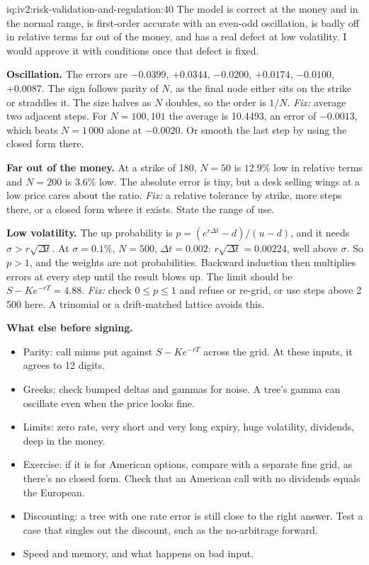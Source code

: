 \begin{solution}{iq:iv2:risk-validation-and-regulation:40}
The model is correct at the money and in the normal range, is first-order accurate with an even-odd oscillation, is badly off in relative terms far out of the money, and has a real defect at low volatility. I would approve it with conditions once that defect is fixed.

\textbf{Oscillation.} The errors are $-0.0399$, $+0.0344$, $-0.0200$, $+0.0174$, $-0.0100$, $+0.0087$. The sign follows parity of $N$, as the final node either sits on the strike or straddles it. The size halves as $N$ doubles, so the order is $1/N$. \emph{Fix:} average two adjacent steps. For $N = 100, 101$ the average is 10.4493, an error of $-0.0013$, which beats $N = 1\,000$ alone at $-0.0020$. Or smooth the last step by using the closed form there.

\textbf{Far out of the money.} At a strike of 180, $N = 50$ is $12.9\%$ low in relative terms and $N = 200$ is $3.6\%$ low. The absolute error is tiny, but a desk selling wings at a low price cares about the ratio. \emph{Fix:} a relative tolerance by strike, more steps there, or a closed form where it exists. State the range of use.

\textbf{Low volatility.} The up probability is $p = (e^{r\Delta t} - d)/(u - d)$, and it needs $\sigma > r\sqrt{\Delta t}$. At $\sigma = 0.1\%$, $N = 500$, $\Delta t = 0.002$: $r\sqrt{\Delta t} = 0.00224$, well above $\sigma$. So $p > 1$, and the weights are not probabilities. Backward induction then multiplies errors at every step until the result blows up. The limit should be $S - Ke^{-rT} = 4.88$. \emph{Fix:} check $0 \le p \le 1$ and refuse or re-grid, or use steps above 2\,500 here. A trinomial or a drift-matched lattice avoids this.

\textbf{What else before signing.}
\begin{itemize}
\item Parity: call minus put against $S - Ke^{-rT}$ across the grid. At these inputs, it agrees to 12 digits.
\item Greeks: check bumped deltas and gammas for noise. A tree's gamma can oscillate even when the price looks fine.
\item Limits: zero rate, very short and very long expiry, huge volatility, dividends, deep in the money.
\item Exercise: if it is for American options, compare with a separate fine grid, as there's no closed form. Check that an American call with no dividends equals the European.
\item Discounting: a tree with one rate error is still close to the right answer. Test a case that singles out the discount, such as the no-arbitrage forward.
\item Speed and memory, and what happens on bad input.
\end{itemize}

\end{solution}

